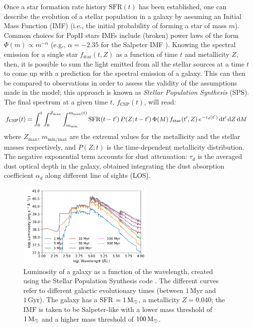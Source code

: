   Once a star formation rate history $\mathrm{SFR}(t)$ has been established, one can describe the evolution of a stellar population in a galaxy by assuming an Initial Mass Function (IMF) (i.e., the initial probability of forming a star of mass $m$). Common choices for PopII stars IMFs include (broken) power laws of the form $\Phi(m) \propto m^{-\alpha}$ (e.g., $\alpha = -2.35$ for the Salpeter IMF \citep{salpeter1955}). Knowing the spectral emission for a single star $f_\mathrm{star}(t,Z)$ as a function of time $t$ and metallicity $Z$, then, it is possible to sum the light emitted from all the stellar sources at a time $t$ to come up with a prediction for the spectral emission of a galaxy. This can then be compared to observations in order to assess the validity of the assumptions made in the model; this approach is known as \textit{Stellar Population Synthesis} (SPS). The final spectrum at a given time $t$, $f_\mathrm{CSP}(t)$, will read:
  \begin{align}
    f_\mathrm{CSP}(t) = \int_{0}^{t} \int_{0}^{Z_\mathrm{max}}\int_{m_\mathrm{min}}^{m_\mathrm{max}(t)} \mathrm{SFR}(t-t')\,P(Z; t-t')\,\Phi(M)\, f_\mathrm{star}(t',Z) \,e^{-\tau_d(t')}\,\mathrm{d} t'\,\mathrm{d} Z\,\mathrm{d} M \label{eq:galaxy_spectrum}
  \end{align}
  where $Z_\mathrm{max}$, $m_\mathrm{min/max}$ are the extremal values for the metallicity and the stellar masses respectively, and $P(Z;t)$ is the time-dependent metallicity distribution. The negative exponential term accounts for dust attenuation: $\tau_d$ is the averaged dust optical depth in the galaxy, obtained integrating the dust absorption coefficient $\alpha_d$ along different line of sights (LOS).
  
  \begin{figure}
	\centering
	\includegraphics[width=0.6\textwidth]{plots/starburst99.PNG}
	\caption{Luminosity of a galaxy as a function of the wavelength, created using the Stellar Population Synthesis code  \citep{leitherer1999}. The different curves refer to different galactic evolutionary times (between $1\,\mathrm{Myr}$ and $1\,\mathrm{Gyr}$). The galaxy has a SFR $=1\,{\rm M}_{\odot}$, a metallicity $Z=0.040$; the IMF is taken to be Salpeter-like with a lower mass threshold of $1\,{\rm M}_{\odot}$ and a higher mass threshold of $100\,{\rm M}_{\odot}$.
	}
	\label{fig:scp}
    \end{figure}
    
